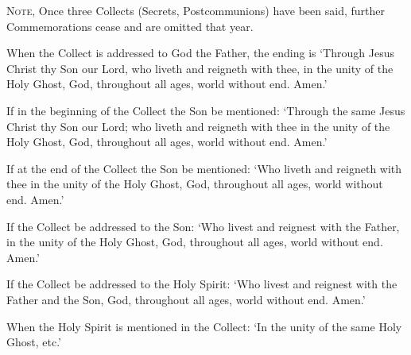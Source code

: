 \begin{description}
\textsc{Note,} Once three Collects (Secrets, Postcommunions) have been said, further Commemorations cease and are omitted that year.
\item[Conclusion of Collects] When the Collect is addressed to God the Father, the ending is `Through Jesus Christ thy Son our Lord, who liveth and reigneth with thee, in the unity of the Holy Ghost, God, throughout all ages, world without end. Amen.'\par
If in the beginning of the Collect the Son be mentioned: `Through the same Jesus Christ thy Son our Lord; who liveth and reigneth with thee in the unity of the Holy Ghost, God, throughout all ages, world without end. Amen.'\par
If at the end of the Collect the Son be mentioned: `Who liveth and reigneth with thee in the unity of the Holy Ghost, God, throughout all ages, world without end. Amen.'\par
If the Collect be addressed to the Son: `Who livest and reignest with the Father, in the unity of the Holy Ghost, God, throughout all ages, world without end. Amen.'\par
If the Collect be addressed to the Holy Spirit: `Who livest and reignest with the Father and the Son, God, throughout all ages, world without end. Amen.'\par
When the Holy Spirit is mentioned in the Collect: `In the unity of the same Holy Ghost, etc.'

\end{description}
